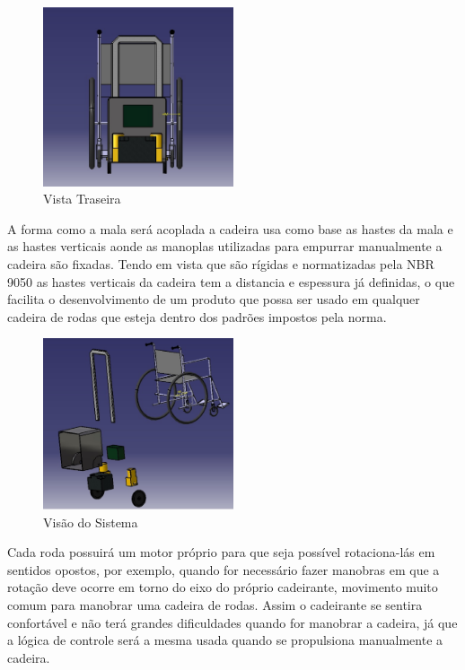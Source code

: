 \begin{figure}[!htb]
\centering
\includegraphics[width=0.5\textwidth]{figuras/estrutura/vista_traseira}
\caption{Vista Traseira}
\label{fig:traseira}
\end{figure}

A forma como a mala será acoplada a cadeira usa como base as hastes da mala e as hastes verticais aonde as manoplas utilizadas para empurrar manualmente a cadeira são fixadas. Tendo em vista que são rígidas e normatizadas pela NBR 9050 as hastes verticais da cadeira tem a distancia e espessura já definidas, o que facilita o desenvolvimento de um produto que possa ser usado em qualquer cadeira de rodas que esteja dentro dos padrões impostos pela norma.

\begin{figure}[!htb]
\centering
\includegraphics[width=0.5\textwidth]{figuras/estrutura/explode}
\caption{Visão do Sistema}
\label{fig:sistema}
\end{figure}

Cada roda possuirá um motor próprio para que seja possível rotaciona-lás em sentidos opostos, por exemplo, quando for necessário fazer manobras em que a rotação deve ocorre em torno do eixo do próprio cadeirante, movimento muito comum para manobrar uma cadeira de rodas. Assim o cadeirante se sentira confortável e não terá grandes dificuldades quando for manobrar a cadeira, já que a lógica de controle será a mesma usada quando se propulsiona manualmente a cadeira.

